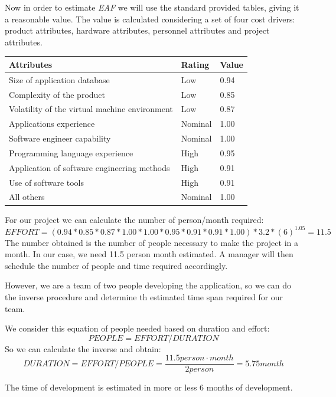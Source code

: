 \documentclass[a4paper]{scrreprt}
\begin{document}
Now in order to estimate \emph{EAF} we will use the standard provided tables, giving it a reasonable value. The value is calculated considering a set of four cost drivers: product attributes, hardware attributes, personnel attributes and project attributes.

\bigskip
\noindent
\begin{tabularx}{\linewidth}{|X|l|l|}
	\hline
	\textbf{Attributes} & \textbf{Rating} & \textbf{Value} \\ \hline
	Size of application database & Low & 0.94 \\ \hline
	Complexity of the product & Low & 0.85 \\ \hline
	Volatility of the virtual machine environment & Low & 0.87 \\ \hline
	Applications experience & Nominal & 1.00 \\ \hline
	Software engineer capability & Nominal & 1.00 \\ \hline
	Programming language experience & High & 0.95 \\ \hline
	Application of software engineering methods & High & 0.91 \\ \hline
	Use of software tools & High & 0.91 \\ \hline
	All others & Nominal & 1.00 \\ \hline
\end{tabularx}
\bigskip
For our project we can calculate the number of person/month required:
\[ EFFORT = (0.94*0.85*0.87*1.00*1.00*0.95*0.91*0.91*1.00)*3.2*(6)^{1.05} = 11.5 \]
The number obtained is the number of people necessary to make the project in a month. In our case, we need 11.5 person month estimated. A manager will then schedule the number of people and time required accordingly.

However, we are a team of two people developing the application, so we can do the inverse procedure and determine th estimated time span required for our team.

We consider this equation of people needed based on duration and effort:
\[PEOPLE = EFFORT / DURATION\]
So we can calculate the inverse and obtain:
\[DURATION = EFFORT / PEOPLE = \frac{11.5person\cdot month}{2 person} = 5.75 month\]

The time of development is estimated in more or less 6 months of development.

%
%
\end{document}
